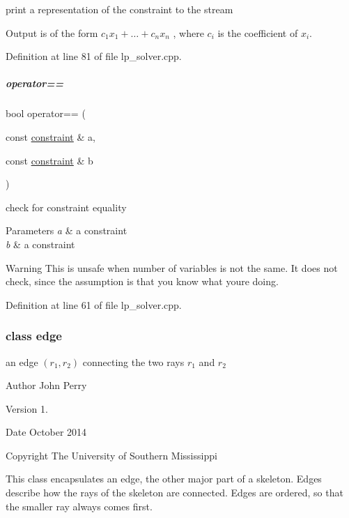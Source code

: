print a representation of the constraint to the stream 

Output is of the form $ c_1 x_1 + \ldots + c_n x_n $ , where $ c_i $ is the coefficient of $ x_i $. 

Definition at line 81 of file lp\+\_\+solver.\+cpp.

\mbox{\label{group___c_l_s_solvers_acb6f7858d12f0c03f1c8be86ecbef902}} 
\subparagraph{\texorpdfstring{operator==}{operator==}}
{\footnotesize\ttfamily bool operator== (\begin{DoxyParamCaption}\item[{const \hyperlink{group___c_l_s_solvers_classconstraint}{constraint} \&}]{a,  }\item[{const \hyperlink{group___c_l_s_solvers_classconstraint}{constraint} \&}]{b }\end{DoxyParamCaption})\hspace{0.3cm}{\ttfamily [friend]}}



check for constraint equality 


\begin{DoxyParams}{Parameters}
{\em a} & a constraint \\
\hline
{\em b} & a constraint \\
\hline
\end{DoxyParams}
\begin{DoxyWarning}{Warning}
This is unsafe when number of variables is not the same. It does not check, since the assumption is that you know what you\textquotesingle{}re doing. 
\end{DoxyWarning}


Definition at line 61 of file lp\+\_\+solver.\+cpp.

\label{classedge}
\subsubsection{class edge}
an edge $(r_1,r_2)$ connecting the two rays $ r_1 $ and $ r_2 $ 

\begin{DoxyAuthor}{Author}
John Perry 
\end{DoxyAuthor}
\begin{DoxyVersion}{Version}
1. 
\end{DoxyVersion}
\begin{DoxyDate}{Date}
October 2014 
\end{DoxyDate}
\begin{DoxyCopyright}{Copyright}
The University of Southern Mississippi
\end{DoxyCopyright}
This class encapsulates an edge, the other major part of a skeleton. Edges describe how the rays of the skeleton are connected. Edges are ordered, so that the smaller ray always comes first.

